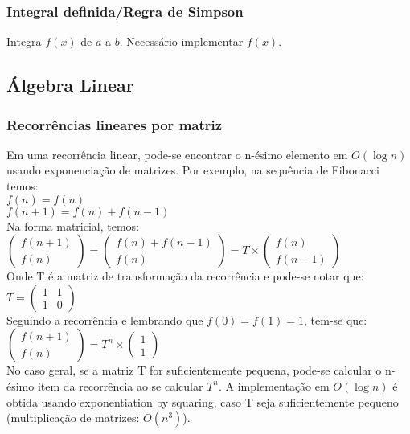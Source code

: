 \subsubsection{Integral definida/Regra de Simpson}
Integra $f(x)$ de $a$ a $b$. Necessário implementar $f(x)$.

\divisor



\subsection{Álgebra Linear}

\subsubsection{Recorrências lineares por matriz}
Em uma recorrência linear, pode-se encontrar o n-ésimo elemento em $O(\log{n})$ usando exponenciação de matrizes. Por exemplo, na sequência de Fibonacci temos:
\\ $f(n) = f(n)$
\\ $f(n+1) = f(n)+f(n-1)$
\\Na forma matricial, temos:
\\
$\left( \begin{array}{c}
f(n+1) \\
f(n) \end{array} \right)
 = 
\left( \begin{array}{c}
f(n) + f(n-1) \\
f(n) \end{array} \right)
 = T \times
\left( \begin{array}{c}
f(n) \\
f(n-1) \end{array} \right)$
\\ Onde T é a matriz de transformação da recorrência e pode-se notar que:
$T=\left( \begin{array}{cc}
1 & 1 \\
1 & 0 \end{array} \right)$
\\ Seguindo a recorrência e lembrando que $f(0) = f(1) = 1$, tem-se que:
\\$\left( \begin{array}{c}
f(n+1) \\
f(n) \end{array} \right) = T^n \times
\left( \begin{array}{c}
1 \\
1 \end{array} \right)$
\\ No caso geral, se a matriz T for suficientemente pequena, pode-se calcular o n-ésimo item da recorrência ao se calcular $T^n$. A implementação em $O(\log{n})$ é obtida usando exponentiation by squaring, caso T seja suficientemente pequeno (multiplica\c{c}\~{a}o de matrizes: $O(n^3)$).

